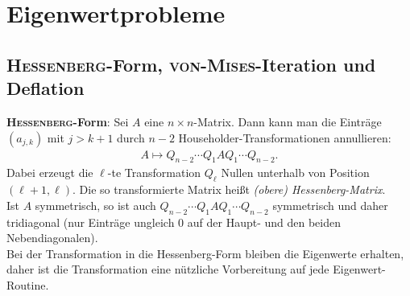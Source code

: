 \chapter{%
    Eigenwertprobleme%
}

\section{%
    \textsc{Hessenberg}-Form, \textsc{von-Mises}-Iteration und Deflation%
}

\textbf{\textsc{Hessenberg}-Form}:
Sei $A$ eine $n \times n$-Matrix.
Dann kann man die Einträge $(a_{j,k})$ mit $j > k + 1$ durch $n - 2$
Householder-Transformationen annullieren:
\begin{align*}
    A \mapsto Q_{n-2} \dotsm Q_1 A Q_1 \dotsm Q_{n-2}.
\end{align*}
Dabei erzeugt die $\ell$-te Transformation $Q_\ell$ Nullen unterhalb
von Position $(\ell + 1, \ell)$.
Die so transformierte Matrix heißt
\emph{(obere) Hessenberg-Matrix}. \\
Ist $A$ symmetrisch, so ist auch $Q_{n-2} \dotsm Q_1 A Q_1 \dotsm Q_{n-2}$
symmetrisch und daher tridiagonal (nur Einträge ungleich $0$ auf der Haupt-
und den beiden Nebendiagonalen). \\
Bei der Transformation in die Hessenberg-Form bleiben die Eigenwerte erhalten,
daher ist die Transformation eine nützliche Vorbereitung auf jede
Eigenwert-Routine.

